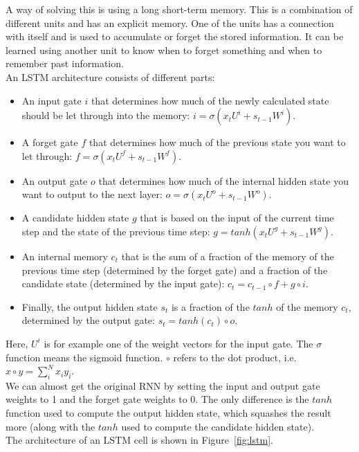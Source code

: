 A way of solving this is using a long short-term memory. This is a combination of different units and has an explicit memory. One of the units has a connection with itself and is used to accumulate or forget the stored information. It can be learned using another unit to know when to forget something and when to remember past information.\\
An LSTM architecture consists of different parts:
\begin{itemize}
\item An input gate $i$ that determines how much of the newly calculated state should be let through into the memory: $i = \sigma (x_tU^i + s_{t-1}W^i)$.
\item A forget gate $f$ that determines how much of the previous state you want to let through: $f = \sigma (x_tU^f + s_{t-1}W^f)$.
\item An output gate $o$ that determines how much of the internal hidden state you want to output to the next layer: $o = \sigma (x_tU^o + s_{t-1}W^o)$.
\item A candidate hidden state $g$ that is based on the input of the current time step and the state of the previous time step: $g = tanh(x_tU^g + s_{t-1}W^g)$.
\item An internal memory $c_t$ that is the sum of a fraction of the memory of the previous time step (determined by the forget gate) and a fraction of the candidate state (determined by the input gate): $c_t = c_{t-1} \circ f + g \circ i$.
\item Finally, the output hidden state $s_t$ is a fraction of the $tanh$ of the memory $c_t$, determined by the output gate: $s_t = tanh(c_t) \circ o$.
\end{itemize}
Here, $U^i$ is for example one of the weight vectors for the input gate. The $\sigma$ function means the sigmoid function. $\circ$ refers to the dot product, i.e. $x \circ y = \sum_i^N x_i y_i$.\\
We can almost get the original RNN by setting the input and output gate weights to 1 and the forget gate weights to 0. The only difference is the $tanh$ function used to compute the output hidden state, which squashes the result more (along with the $tanh$ used to compute the candidate hidden state).\\
The architecture of an LSTM cell is shown in Figure~\ref{fig:lstm}.
